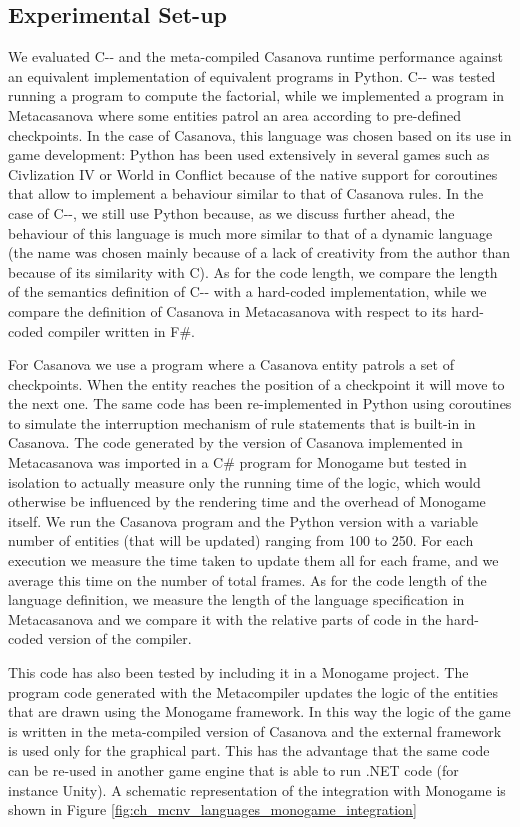 \subsection{Experimental Set-up}
We evaluated C-{}- and the meta-compiled Casanova runtime performance against an equivalent implementation of equivalent programs in Python. C-{}- was tested running a program to compute the factorial, while we implemented a program in Metacasanova where some entities patrol an area according to pre-defined checkpoints. In the case of Casanova, this language was chosen based on its use in game development: Python has been used extensively in several games such as Civlization IV \cite{CIV4} or World in Conflict \cite{WIC} because of the native support for coroutines that allow to implement a behaviour similar to that of Casanova rules. In the case of C-{}-, we still use Python because, as we discuss further ahead, the behaviour of this language is much more similar to that of a dynamic language (the name was chosen mainly because of a lack of creativity from the author than because of its similarity with C). As for the code length, we compare the length of the semantics definition of C-{}- with a hard-coded implementation, while we compare the definition of Casanova in Metacasanova with respect to its hard-coded compiler written in F\#.

For Casanova we use a program where a Casanova entity patrols a set of checkpoints. When the entity reaches the position of a checkpoint it will move to the next one. The same code has been re-implemented in Python using coroutines to simulate the interruption mechanism of rule statements that is built-in in Casanova. The code generated by the version of Casanova implemented in Metacasanova was imported in a C\# program for Monogame but tested in isolation to actually measure only the running time of the logic, which would otherwise be influenced by the rendering time and the overhead of Monogame itself. We run the Casanova program and the Python version with a variable number of entities (that will be updated) ranging from 100 to 250. For each execution we measure the time taken to update them all for each frame, and we average this time on the number of total frames. As for the code length of the language definition, we measure the length of the language specification in Metacasanova and we compare it with the relative parts of code in the hard-coded version of the compiler.

This code has also been tested by including it in a Monogame project. The program code generated with the Metacompiler updates the logic of the entities that are drawn using the Monogame framework. In this way the logic of the game is written in the meta-compiled version of Casanova and the external framework is used only for the graphical part. This has the advantage that the same code can be re-used in another game engine that is able to run .NET code (for instance Unity). A schematic representation of the integration with Monogame is shown in Figure \ref{fig:ch_mcnv_languages_monogame_integration}

